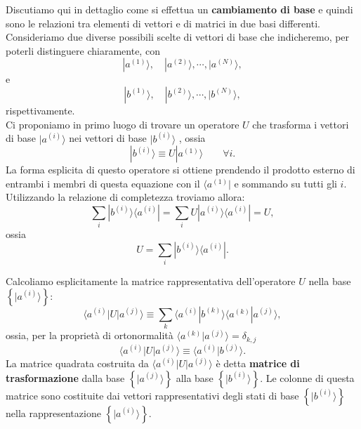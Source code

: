 \documentclass[a4paper,12pt,oneside]{book}
\begin{document}
Discutiamo qui in dettaglio come si effettua un \textbf{cambiamento di base} e quindi sono le relazioni tra elementi di vettori e di matrici in due basi differenti. Consideriamo due diverse possibili scelte di vettori di base che indicheremo, per poterli distinguere chiaramente, con 
	\begin{equation}
		| a^{(1)} \rangle , \quad  | a^{(2)} \rangle , \cdots , | a^{(N)} \rangle ,
	\end{equation}
e
	\begin{equation}
		| b^{(1)} \rangle , \quad | b^{(2)} \rangle , \cdots , | b^{(N)} \rangle ,
	\end{equation}
rispettivamente. \\
Ci proponiamo in primo luogo di trovare un operatore $U$ che trasforma i vettori di base $| a^{(i)} \rangle$ nei vettori di base $| b^{(i)} \rangle $ , ossia 
	\begin{equation}
		\boxed{\boxed{		
			| b^{(i)} \rangle \equiv U | a^{(1)} \rangle 
			}}\qquad \forall i .
	\end{equation}
La forma esplicita di questo operatore si ottiene prendendo il prodotto esterno di entrambi i membri di questa equazione con il $\langle a^{(1)}| $ e sommando su tutti gli $i$. Utilizzando la relazione di completezza troviamo allora:
	\begin{equation}
		\sum \limits_{i} | b^{(i)} \rangle \langle a^{(i)} |  = \sum \limits_{i} U | a^{(i)} \rangle \langle a^{(i)} |  = U ,
	\end{equation}
ossia
	\begin{equation}
		\boxed{\boxed{
			U = \sum \limits_{i} | b^{(i)} \rangle \langle a^{(i)} | .
			}}
	\end{equation}

Calcoliamo esplicitamente la matrice rappresentativa dell'operatore $U$ nella base $\left\{ | a^{(i)} \rangle    \right\} $:
	\begin{equation}
			\langle a^{(i)} | U | a^{(j)} \rangle \equiv \sum \limits_{k} \langle a^{(i)} | b^{(k)} \rangle  \langle a^{(k)} | a^{(j)} \rangle  ,
	\end{equation}
ossia, per la proprietà di ortonormalità $\langle a^{(k)} | a^{(j)} \rangle  =\delta_{k,j}$
	\begin{equation}
		\boxed{
			\langle a^{(i)} | U | a^{(j)} \rangle \equiv \langle a^{(i)} | b^{(j)} \rangle .
			}
	\end{equation}
La matrice quadrata costruita da $\langle a^{(i)} | U | a^{(j)} \rangle $ è detta \textbf{matrice di trasformazione} dalla base $\left\{ | a^{(j)} \rangle  \right\}$ alla base $\left\{ | b^{(i)} \rangle  \right\}$. Le colonne di questa matrice sono costituite dai vettori rappresentativi degli stati di base $\left\{ | b^{(i)} \rangle  \right\}$ nella rappresentazione $\left\{ | a^{(i)} \rangle  \right\}$.\\
\end{document}
